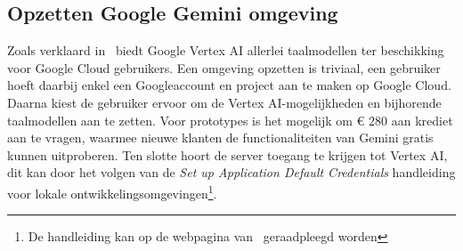 \subsection{Opzetten Google Gemini omgeving}
\label{subsec:opzetten-google-gemini-omgeving}
Zoals verklaard in~ biedt Google Vertex AI allerlei taalmodellen ter beschikking voor Google Cloud gebruikers.
Een omgeving opzetten is triviaal, een gebruiker hoeft daarbij enkel een Googleaccount en project aan te maken op Google Cloud.
Daarna kiest de gebruiker ervoor om de Vertex AI-mogelijkheden en bijhorende taalmodellen aan te zetten.
Voor prototypes is het mogelijk om € 280 aan krediet aan te vragen, waarmee nieuwe klanten de functionaliteiten van Gemini gratis kunnen uitproberen.
Ten slotte hoort de server toegang te krijgen tot Vertex AI, dit kan door het volgen van de \textit{Set up Application Default Credentials} handleiding voor lokale ontwikkelingsomgevingen\footnote{De handleiding kan op de webpagina van~\textcite{GoogleCloud} geraadpleegd worden}.


